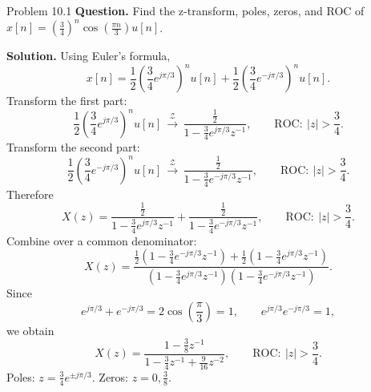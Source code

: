 \documentclass[10pt]{article}
\newcommand{\ROC}{\mathrm{ROC}}
\newcommand{\ZT}{\mathcal{Z}}
\newcommand{\Prompt}[1]{\textbf{Question.} #1}
\newcommand{\SketchLabel}{\tcblower\textbf{Solution.}}
\newcommand{\Zpair}[2]{#1\,\mathrel{\overset{\ZT}{\longrightarrow}}\,#2}
\begin{document}
\begin{examplebox}{Problem 10.1}
  \Prompt{Find the z-transform, poles, zeros, and ROC of \(x[n]=\left(\frac34\right)^n\cos\!\left(\frac{\pi n}{3}\right)u[n]\).}

  \medskip
  \SketchLabel{}
  Using Euler's formula,
  \[
    x[n]=\frac12\!\left(\frac34 e^{j\pi/3}\right)^{\!n} u[n]+\frac12\!\left(\frac34 e^{-j\pi/3}\right)^{\!n} u[n].
  \]
  Transform the first part:
  \[
    \Zpair{\frac12\!\left(\frac34 e^{j\pi/3}\right)^{\!n} u[n]}
    {\frac{\frac12}{1-\frac34 e^{j\pi/3}z^{-1}}},
    \qquad
    \ROC:\ |z|>\frac34.
  \]
  Transform the second part:
  \[
    \Zpair{\frac12\!\left(\frac34 e^{-j\pi/3}\right)^{\!n} u[n]}
    {\frac{\frac12}{1-\frac34 e^{-j\pi/3}z^{-1}}},
    \qquad
    \ROC:\ |z|>\frac34.
  \]
  Therefore
  \[
    X(z)=\frac{\frac12}{1-\frac34 e^{j\pi/3}z^{-1}}
    +\frac{\frac12}{1-\frac34 e^{-j\pi/3}z^{-1}},
    \qquad
    \ROC:\ |z|>\frac34.
  \]
  Combine over a common denominator:
  \[
    X(z)=\frac{\frac12\!\left(1-\frac34 e^{-j\pi/3}z^{-1}\right)
    +\frac12\!\left(1-\frac34 e^{j\pi/3}z^{-1}\right)}
    {\left(1-\frac34 e^{j\pi/3}z^{-1}\right)\left(1-\frac34 e^{-j\pi/3}z^{-1}\right)}.
  \]
  Since
  \[
    e^{j\pi/3}+e^{-j\pi/3}=2\cos\!\left(\frac{\pi}{3}\right)=1,
    \qquad
    e^{j\pi/3}e^{-j\pi/3}=1,
  \]
  we obtain
  \[
    X(z)=\frac{1-\frac38 z^{-1}}{1-\frac34 z^{-1}+\frac{9}{16}z^{-2}},
    \qquad
    \ROC:\ |z|>\frac34.
  \]
  Poles: \(z=\frac34 e^{\pm j\pi/3}\). Zeros: \(z=0,\frac38\).

  \begin{center}
  \end{center}
\end{examplebox}
\end{document}
